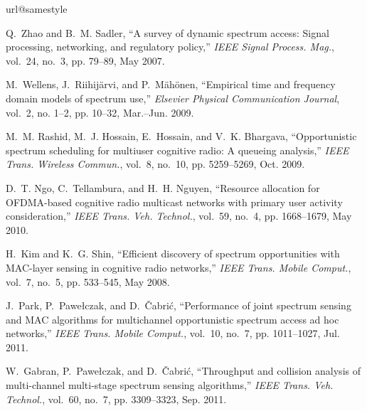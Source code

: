 \documentclass[11pt,draftclsnofoot,journal,onecolumn]{IEEEtran}
\begin{document}
\begin{thebibliography}{10}
\providecommand{\url}[1]{#1}
\csname url@samestyle\endcsname
\providecommand{\newblock}{\relax}
\providecommand{\bibinfo}[2]{#2}
\providecommand{\BIBentrySTDinterwordspacing}{\spaceskip=0pt\relax}
\providecommand{\BIBentryALTinterwordstretchfactor}{4}
\providecommand{\BIBentryALTinterwordspacing}{\spaceskip=\fontdimen2\font plus
\BIBentryALTinterwordstretchfactor\fontdimen3\font minus
  \fontdimen4\font\relax}
\providecommand{\BIBforeignlanguage}[2]{{\expandafter\ifx\csname l@#1\endcsname\relax
\else
\language=\csname l@#1\endcsname
\fi
#2}}
\providecommand{\BIBdecl}{\relax}
\BIBdecl

Q.~{Zhao} and B.~M. {Sadler}, ``A survey of dynamic spectrum access: Signal
  processing, networking, and regulatory policy,'' \emph{{IEEE} Signal Process.
  Mag.}, vol.~24, no.~3, pp. 79--89, May 2007.

M.~{Wellens}, J.~{Riihij{\"a}rvi}, and P.~{M{\"a}h{\"o}nen}, ``Empirical time
  and frequency domain models of spectrum use,'' \emph{Elsevier Physical
  Communication Journal}, vol.~2, no. 1--2, pp. 10--32, Mar.--Jun. 2009.

M.~M. {Rashid}, M.~J. {Hossain}, E.~{Hossain}, and V.~K. {Bhargava},
  ``Opportunistic spectrum scheduling for multiuser cognitive radio: A queueing
  analysis,'' \emph{{IEEE} Trans. Wireless Commun.}, vol.~8, no.~10, pp.
  5259--5269, Oct. 2009.

D.~T. {Ngo}, C.~{Tellambura}, and H.~H. {Nguyen}, ``Resource allocation for
  {OFDMA}-based cognitive radio multicast networks with primary user activity
  consideration,'' \emph{{IEEE} Trans. Veh. Technol.}, vol.~59, no.~4, pp.
  1668--1679, May 2010.

H.~{Kim} and K.~G. {Shin}, ``Efficient discovery of spectrum opportunities with
  {MAC}-layer sensing in cognitive radio networks,'' \emph{{IEEE} Trans. Mobile
  Comput.}, vol.~7, no.~5, pp. 533--545, May 2008.

J.~{Park}, P.~{Pawe{\l}czak}, and D.~{\v{C}abri\'{c}}, ``Performance of joint
  spectrum sensing and {MAC} algorithms for multichannel opportunistic spectrum
  access ad hoc networks,'' \emph{{IEEE} Trans. Mobile Comput.}, vol.~10,
  no.~7, pp. 1011--1027, Jul. 2011.

W.~{Gabran}, P.~{Pawe{\l}czak}, and D.~{\v{C}abri\'{c}}, ``Throughput and
  collision analysis of multi-channel multi-stage spectrum sensing
  algorithms,'' \emph{{IEEE} Trans. Veh. Technol.}, vol.~60, no.~7, pp.
  3309--3323, Sep. 2011.


\end{thebibliography}
\end{document}
